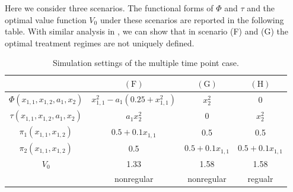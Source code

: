 \documentclass[11pt]{article}
\theoremstyle{referenceplain}
\theoremstyle{referencedefinition}
\theoremstyle{referenceremark}
\begin{document}
Here we consider three scenarios. The functional forms of $\Phi$ and $\tau$ and the optimal value function $V_0$ under these scenarios are reported in the following table. With similar analysis in \citet{shi2020breaking}, we can show that in scenario (F) and (G) the optimal treatment regimes are not uniquely defined.
\begin{table}[H]
    \centering
    \begin{tabular}{cccc}
\hline \hline & $(\mathrm{F})$ & $(\mathrm{G})$ & $(\mathrm{H})$ \\
\hline$\Phi\left(x_{1,1}, x_{1,2}, a_1, x_2\right)$ & $x_{1,1}^2-a_1\left(0.25+x_{1,1}^2\right)$ & $x_2^2$ & 0 \\
\hline$\tau\left(x_{1,1}, x_{1,2}, a_1, x_2\right)$ & $a_1 x_2^2$ & 0 & $x_2^2$ \\
\hline $\pi_1(x_{1,1},x_{1,2})$ & $0.5+0.1 x_{1,1}$ & 0.5 & 0.5\\
\hline $\pi_2(x_{1,1},x_{1,2})$ & 0.5 & $0.5+0.1 x_{1,1}$ & $0.5+0.1 x_{1,1}$\\
\hline$V_0$ & 1.33 & 1.58 & 1.58 \\
\hline
 & nonregular & nonregular & regualr \\
\hline
\end{tabular}
    \caption{Simulation settings of the multiple time point case.}
    \label{multi-setting}
\end{table}
\end{document}
